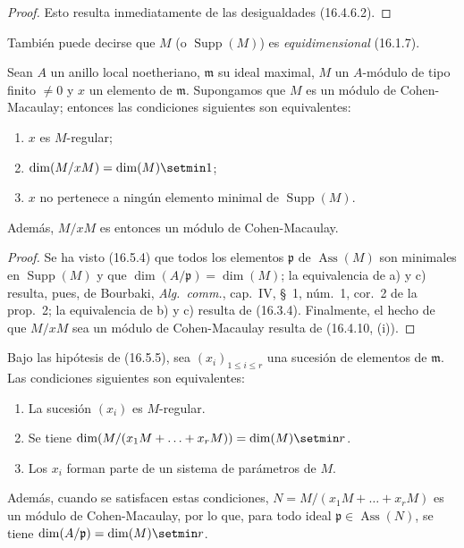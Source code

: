 \begin{proof}
Esto resulta inmediatamente de las desigualdades (16.4.6.2).
\end{proof}

También puede decirse que $M$ (o $\operatorname{Supp}(M)$) es
\emph{equidimensional} (16.1.7).


\begin{proposition}[16.5.5]
\label{0.16.5.5-fr}
Sean $A$ un anillo local noetheriano, $\mathfrak{m}$ su ideal maximal, $M$
un $A$-módulo de tipo finito $\neq0$ y $x$ un elemento de $\mathfrak{m}$.
Supongamos que $M$ es un módulo de Cohen-Macaulay; entonces las condiciones
siguientes son equivalentes:
\begin{enumerate}
  \item[\textup{a)}] $x$ es $M$-regular;
  \item[\textup{b)}] $\dim(M/xM)=\dim(M)\setmin 1$;
  \item[\textup{c)}] $x$ no pertenece a ningún elemento minimal de
  $\operatorname{Supp}(M)$.
\end{enumerate}
Además, $M/xM$ es entonces un módulo de Cohen-Macaulay.
\end{proposition}

\begin{proof}
Se ha visto (16.5.4) que todos los elementos $\mathfrak{p}$ de
$\operatorname{Ass}(M)$ son minimales en $\operatorname{Supp}(M)$ y que
$\dim(A/\mathfrak{p})=\dim(M)$; la equivalencia de a) y c) resulta, pues, de
Bourbaki, \emph{Alg.~comm.}, cap.~IV, \S~1, núm.~1, cor.~2 de la prop.~2;
la equivalencia de b) y c) resulta de (16.3.4). Finalmente, el hecho de que
$M/xM$ sea un módulo de Cohen-Macaulay resulta de (16.4.10, (i)).
\end{proof}

\begin{corollary}[16.5.6]
\label{0.16.5.6-fr}
Bajo las hipótesis de \textup{(16.5.5)}, sea $(x_i)_{1\leq i\leq r}$ una sucesión
de elementos de $\mathfrak{m}$. Las condiciones siguientes son equivalentes:
\begin{enumerate}
  \item[\textup{a)}] La sucesión $(x_i)$ es $M$-regular.
  \item[\textup{b)}] Se tiene
  $\dim(M/(x_1M+\ldots+x_rM))=\dim(M)\setmin r$.
  \item[\textup{c)}] Los $x_i$ forman parte de un sistema de parámetros de $M$.
\end{enumerate}
Además, cuando se satisfacen estas condiciones,
$N=M/(x_1M+\ldots+x_rM)$ es un módulo de Cohen-Macaulay, por lo que, para todo
ideal $\mathfrak{p}\in\operatorname{Ass}(N)$, se tiene
$\dim(A/\mathfrak{p})=\dim(M)\setmin r$.
\end{corollary}

